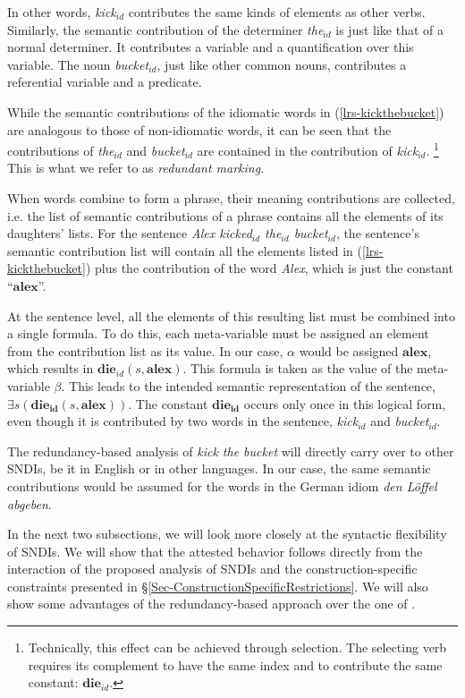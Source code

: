 \documentclass[output=paper]{langsci/langscibook}
\begin{document}
In other words, \textit{kick$_{id}$} contributes the same kinds of elements as other verbs. Similarly, the semantic contribution of the determiner \textit{the$_{id}$} is just like that of a normal determiner. It contributes a variable and a quantification over this variable. The noun \textit{bucket$_{id}$}, just like other common nouns, contributes a referential variable and a predicate.

While the semantic contributions of the idiomatic words in (\ref{lrs-kickthebucket}) are analogous to those of non-idiomatic words, it can be seen that the contributions of \textit{the}$_{id}$ and \textit{bucket}$_{id}$ are contained in the contribution of \textit{kick}$_{id}$.%
\footnote{Technically, this effect can be achieved through selection. The selecting verb requires its complement to have the same index and to contribute the same constant: $\mathbf{die}_{id}$.}
%
This is what we refer to as \emph{redundant marking}.

When words combine to form a phrase, their meaning contributions are collected, i.e. the list of semantic contributions of a phrase contains all the elements of its daughters' lists. For the sentence \textit{Alex kicked$_{id}$ the$_{id}$ bucket$_{id}$}, the sentence's semantic contribution list will contain all the elements listed in (\ref{lrs-kickthebucket}) plus the contribution of the word \textit{Alex}, which is just the constant ``$\mathbf{alex}$''.

At the sentence level,  all the elements of this resulting list must be combined into a single formula. To do this, each meta-variable must be assigned an element from the contribution list as its value. In our case, $\alpha$ would be assigned $\mathbf{alex}$, which results in $\mathbf{die}_{id}(s,\mathbf{alex})$. This formula is taken as the value of the meta-variable $\beta$. This leads to the intended semantic representation of the sentence, $\exists s (\mathbf{die_{id}}(s,\mathbf{alex}))$. The constant $\mathbf{die_{id}}$ occurs only once in this logical form, even though it is contributed by two words in the sentence, \textit{kick}$_{id}$ and \textit{bucket}$_{id}$.

The redundancy-based analysis of \textit{kick the bucket} will directly carry over to other SNDIs, be it in English or in other languages. In our case, the same semantic contributions would be assumed for the words in the  German idiom \textit{den L\"offel abgeben}.
 
In the next two subsections, we will look more closely at the syntactic flexi\-bility of SNDIs. We will show that the attested behavior follows directly from the interaction of the proposed analysis of SNDIs and the construction-specific constraints presented in §\ref{Sec-ConstructionSpecificRestrictions}. We will also show some advantages of the redundancy-based approach over the one of \cite{kaysagidioms}.
\end{document}
